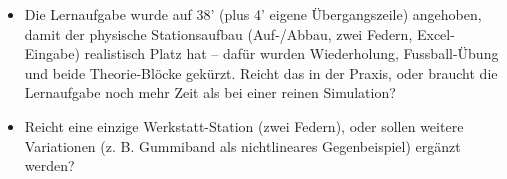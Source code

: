 \documentclass[11pt,a4paper]{article}
\begin{document}
\begin{itemize}[leftmargin=1.2cm,itemsep=0.4em]
  \item Die Lernaufgabe wurde auf 38' (plus 4' eigene Übergangszeile)
  angehoben, damit der physische Stationsaufbau (Auf-/Abbau, zwei Federn,
  Excel-Eingabe) realistisch Platz hat -- dafür wurden Wiederholung,
  Fussball-Übung und beide Theorie-Blöcke gekürzt. Reicht das in der
  Praxis, oder braucht die Lernaufgabe noch mehr Zeit als bei einer reinen
  Simulation?
  \item Reicht eine einzige Werkstatt-Station (zwei Federn), oder sollen
  weitere Variationen (z. B. Gummiband als nichtlineares Gegenbeispiel)
  ergänzt werden?
\end{itemize}
\end{document}
